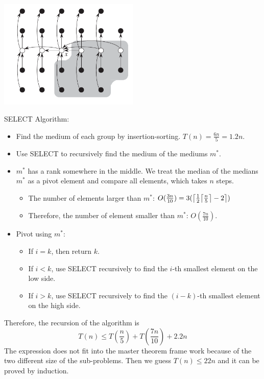 \documentclass[en,hazy,blue,screen,14pt]{elegantnote}
\DeclarePairedDelimiter{\ceil}{\lceil}{\rceil}
\begin{document}
\centerline{\includegraphics[width=0.5\textwidth]{deterministic-select.png}}

SELECT Algorithm:
\begin{itemize}
\item Find the medium of each group by insertion-sorting. $T(n) = \frac{6n}{5} 
= 1.2n$.
\item Use SELECT to recursively find the medium of the mediums $m^*$.
\item $m^*$ has a rank somewhere in the middle.
We treat the median of the medians $m^*$ as a pivot element and compare all 
elements, which takes $n$ steps.
    \begin{itemize}
        \item The number of elements larger than $m^*$: $O(\frac{3n}{10}) 
    =3(\ceil*{\frac{1}{2}\ceil*{\frac{n}{5}} - 2})$
        \item Therefore, the number of element smaller than $m^*$: 
    $O(\frac{7n}{10})$.
    \end{itemize}
\item Pivot using $m^*$:
    \begin{itemize}
     \item If $i = k$, then return $k$.
     \item If $i < k$, use SELECT recursively to find the $i$-th smallest 
element on the low side.
     \item If $i > k$, use SELECT recursively to find the $(i-k)$-th smallest 
element on the high side.
    \end{itemize}
\end{itemize}
Therefore, the recursion of the algorithm is
\[T(n) \le T(\frac{n}{5}) + T(\frac{7n}{10}) + 2.2n\]
The expression does not fit into the master theorem frame work because of the 
two different size of the sub-problems. Then we guess $T(n) \le 22n$ and it can 
be proved by induction.
\end{document}
